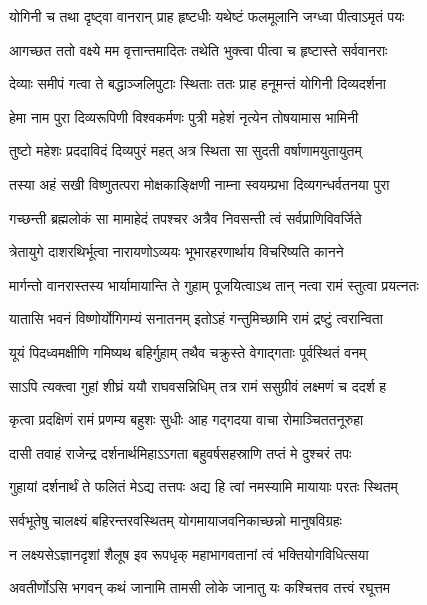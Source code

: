 \twolineshloka
{योगिनी च तथा दृष्ट्वा वानरान् प्राह हृष्टधीः}
{यथेष्टं फलमूलानि जग्ध्वा पीत्वाऽमृतं पयः} %

\twolineshloka
{आगच्छत ततो वक्ष्ये मम वृत्तान्तमादितः}
{तथेति भुक्त्वा पीत्वा च हृष्टास्ते सर्ववानराः} %

\twolineshloka
{देव्याः समीपं गत्वा ते बद्धाञ्जलिपुटाः स्थिताः}
{ततः प्राह हनूमन्तं योगिनी दिव्यदर्शना} %

\twolineshloka
{हेमा नाम पुरा दिव्यरूपिणी विश्वकर्मणः}
{पुत्री महेशं नृत्येन तोषयामास भामिनी} %

\twolineshloka
{तुष्टो महेशः प्रददाविदं दिव्यपुरं महत्}
{अत्र स्थिता सा सुदती वर्षाणामयुतायुतम्} %

\twolineshloka
{तस्या अहं सखी विष्णुतत्परा मोक्षकाङ्क्षिणी}
{नाम्ना स्वयम्प्रभा दिव्यगन्धर्वतनया पुरा} %

\twolineshloka
{गच्छन्ती ब्रह्मलोकं सा मामाहेदं तपश्चर}
{अत्रैव निवसन्ती त्वं सर्वप्राणिविवर्जिते} %

\twolineshloka
{त्रेतायुगे दाशरथिर्भूत्वा नारायणोऽव्ययः}
{भूभारहरणार्थाय विचरिष्यति कानने} %

\twolineshloka
{मार्गन्तो वानरास्तस्य भार्यामायान्ति ते गुहाम्}
{पूजयित्वाऽथ तान् नत्वा रामं स्तुत्वा प्रयत्नतः} %

\twolineshloka
{यातासि भवनं विष्णोर्योगिगम्यं सनातनम्}
{इतोऽहं गन्तुमिच्छामि रामं द्रष्टुं त्वरान्विता} %

\twolineshloka
{यूयं पिदध्वमक्षीणि गमिष्यथ बहिर्गुहाम्}
{तथैव चक्रुस्ते वेगाद्गताः पूर्वस्थितं वनम्} %

\twolineshloka
{साऽपि त्यक्त्वा गुहां शीघ्रं ययौ राघवसन्निधिम्}
{तत्र रामं ससुग्रीवं लक्ष्मणं च ददर्श ह} %

\twolineshloka
{कृत्वा प्रदक्षिणं रामं प्रणम्य बहुशः सुधीः}
{आह गद्गदया वाचा रोमाञ्चिततनूरुहा} %

\twolineshloka
{दासी तवाहं राजेन्द्र दर्शनार्थमिहाऽऽगता}
{बहुवर्षसहस्राणि तप्तं मे दुश्चरं तपः} %

\twolineshloka
{गुहायां दर्शनार्थं ते फलितं मेऽद्य तत्तपः}
{अद्य हि त्वां नमस्यामि मायायाः परतः स्थितम्} %

\twolineshloka
{सर्वभूतेषु चालक्ष्यं बहिरन्तरवस्थितम्}
{योगमायाजवनिकाच्छन्नो मानुषविग्रहः} %

\twolineshloka
{न लक्ष्यसेऽज्ञानदृशां शैलूष इव रूपधृक्}
{महाभागवतानां त्वं भक्तियोगविधित्सया} %

\twolineshloka
{अवतीर्णोऽसि भगवन् कथं जानामि तामसी}
{लोके जानातु यः कश्चित्तव तत्त्वं रघूत्तम} %

